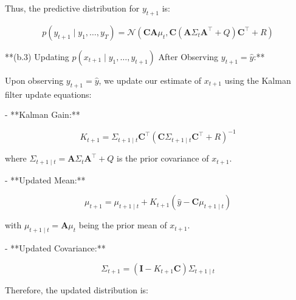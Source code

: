 \documentclass[12pt]{article}
\begin{document}
Thus, the predictive distribution for \( y_{t+1} \) is:

\[
p(y_{t+1} \mid y_1, \dots, y_T) = \mathcal{N}(\mathbf{C} \mathbf{A} \mu_t, \mathbf{C} (\mathbf{A} \Sigma_t \mathbf{A}^\top + Q) \mathbf{C}^\top + R)
\]

**(b.3) Updating \( p(x_{t+1} \mid y_1, \dots, y_{t+1}) \) After Observing \( y_{t+1} = \hat{y} \):**

Upon observing \( y_{t+1} = \hat{y} \), we update our estimate of \( x_{t+1} \) using the Kalman filter update equations:

- **Kalman Gain:**

  \[
  K_{t+1} = \Sigma_{t+1 \mid t} \mathbf{C}^\top (\mathbf{C} \Sigma_{t+1 \mid t} \mathbf{C}^\top + R)^{-1}
  \]

  where \( \Sigma_{t+1 \mid t} = \mathbf{A} \Sigma_t \mathbf{A}^\top + Q \) is the prior covariance of \( x_{t+1} \).

- **Updated Mean:**

  \[
  \mu_{t+1} = \mu_{t+1 \mid t} + K_{t+1} (\hat{y} - \mathbf{C} \mu_{t+1 \mid t})
  \]

  with \( \mu_{t+1 \mid t} = \mathbf{A} \mu_t \) being the prior mean of \( x_{t+1} \).

- **Updated Covariance:**

  \[
  \Sigma_{t+1} = (\mathbf{I} - K_{t+1} \mathbf{C}) \Sigma_{t+1 \mid t}
  \]

Therefore, the updated distribution is:
\end{document}

